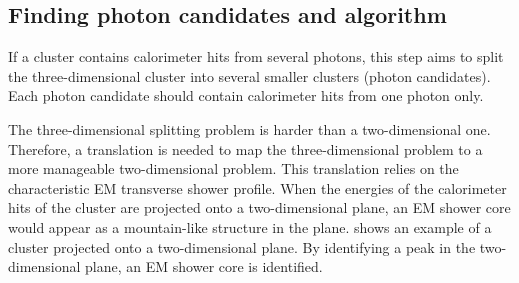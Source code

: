 


\subsection{Finding photon candidates and \peakFinding algorithm}
\label{sec:peakFinding}
If a cluster contains calorimeter hits from several photons, this step aims to split the three-dimensional cluster into several smaller clusters (photon candidates). Each photon candidate should contain calorimeter hits from one photon only.


The three-dimensional splitting problem is harder than a two-dimensional one. Therefore, a translation is needed to map the three-dimensional problem to a more manageable two-dimensional problem. This translation relies on the characteristic EM transverse shower profile. When the energies of the calorimeter hits of the cluster are projected onto a two-dimensional plane, an EM shower core would appear as a mountain-like structure in the plane.  shows an example of a cluster projected onto a two-dimensional plane. By identifying a peak in the two-dimensional plane, an EM shower core is identified.





